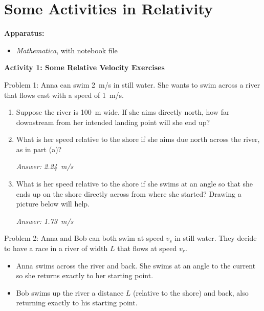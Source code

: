 \section{Some Activities in Relativity}


\makelabheader %

\bigskip
\textbf{Apparatus:}
\begin{itemize}[nosep]
\item \textit{Mathematica}, with notebook file 
\end{itemize}


\bigskip
\textbf{Activity 1: Some Relative Velocity Exercises} 

Problem 1: Anna can swim 2~m/s in still water.  She wants to swim across a river that flows east with a speed of 1~m/s.

\begin{enumerate}[labparts]
\item Suppose the river is 100~m wide.  If she aims directly north, how far downstream from her intended landing point will she end up?
\answerspace{0.6in}

\item What is her speed relative to the shore if she aims due north across the river, as in part (a)?
\answerspace{0.6in}

\hspace{\fill}\textit{Answer: 2.24~m/s}

\item What is her speed relative to the shore if she swims at an angle so that she ends up on the shore directly across from where she started?  Drawing a picture below will help.
\answerspace{0.6in}

\hspace{\fill}\textit{Answer: 1.73~m/s}

\end{enumerate}

Problem 2: Anna and Bob can both swim at speed $v_s$ in still water.  They decide to have a race in a river of width $L$ that flows at speed $v_r$.
\begin{itemize}[nosep]
\item Anna swims across the river and back.  She swims at an angle to the current so she returns exactly to her starting point.
\item Bob swims up the river a distance $L$ (relative to the shore) and back, also returning exactly to his starting point. 
\end{itemize}

